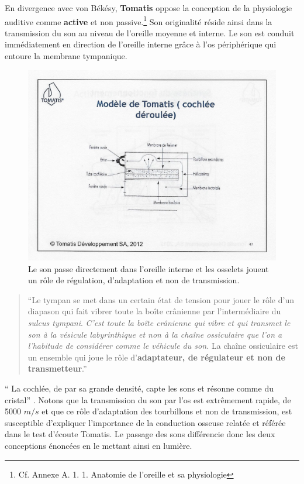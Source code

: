 En divergence avec von Békésy, \textbf{Tomatis} oppose la conception de la
physiologie auditive comme \textbf{active} et non
passive.\footnote{Cf. Annexe A. 1. 1. Anatomie de l'oreille et sa physiologie}
Son originalité réside ainsi dans la transmission du son
au niveau de l'oreille moyenne et interne. Le son est conduit immédiatement en direction de l'oreille 
interne grâce à l'os périphérique qui entoure la membrane tympanique.
\begin{figure}
	\centering
	\includegraphics[width=0.7\linewidth]{images/Cochleederoule_haut.jpg}
	\caption[Cochlée selon Tomatis]{Le son passe directement  
		dans l'oreille interne et les osselets jouent un rôle de régulation, d'adaptation et non de 
		transmission.}
	\label{fig:cochleederoulehaut}
\end{figure}
\begin{quotation}
	``Le tympan se met dans un certain état de tension pour jouer le
	rôle d'un diapason qui fait vibrer toute la boîte crânienne
	par l'intermédiaire du \emph{sulcus tympani}.
	\emph{C'est toute la boîte crânienne qui vibre et qui transmet le son à
		la vésicule labyrinthique et non à la chaîne ossiculaire que l'on a l'habitude
		de considérer comme le véhicule du son.} La chaîne ossiculaire est un ensemble
	qui
	joue le rôle d'\textbf{adaptateur, de régulateur et non de transmetteur}.'' \autocite {tomatis_conf1972}

\end{quotation}
\enquote {	La cochlée, de par sa grande densité, capte les sons
	et résonne comme du cristal}  \autocite {tomatis_conf1972}.
Notons que la transmission du son par l'os est extrêmement rapide, de
5000 $m/s$ et que ce rôle d'adaptation des tourbillons et non de transmission, 
est susceptible d'expliquer l'importance de  
la conduction osseuse relatée et référée dans le  test d'écoute Tomatis.
Le passage des sons différencie donc les deux conceptions énoncées 
en le mettant ainsi en lumière. 

